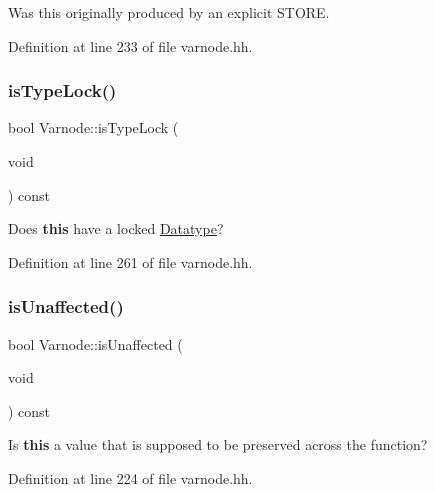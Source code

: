 Was this originally produced by an explicit S\+T\+O\+RE. 



Definition at line 233 of file varnode.\+hh.

\mbox{\label{class_varnode_ad24cac232b92c370f737a44a4c8f0c0e}} 
\subsubsection{\texorpdfstring{isTypeLock()}{isTypeLock()}}
{\footnotesize\ttfamily bool Varnode\+::is\+Type\+Lock (\begin{DoxyParamCaption}\item[{void}]{ }\end{DoxyParamCaption}) const\hspace{0.3cm}{\ttfamily [inline]}}



Does {\bfseries{this}} have a locked \mbox{\hyperlink{class_datatype}{Datatype}}? 



Definition at line 261 of file varnode.\+hh.

\mbox{\label{class_varnode_a68b1c26ef731500527e78b78da049bcb}} 
\subsubsection{\texorpdfstring{isUnaffected()}{isUnaffected()}}
{\footnotesize\ttfamily bool Varnode\+::is\+Unaffected (\begin{DoxyParamCaption}\item[{void}]{ }\end{DoxyParamCaption}) const\hspace{0.3cm}{\ttfamily [inline]}}



Is {\bfseries{this}} a value that is supposed to be preserved across the function? 



Definition at line 224 of file varnode.\+hh.

\mbox{\label{class_varnode_a80776efcc750bb3945fb2b3fa7ffa346}} 
